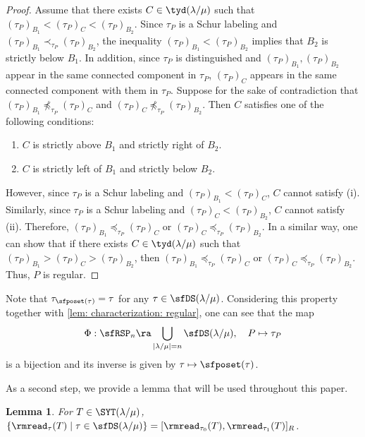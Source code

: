 \documentclass[12pt, reqno]{amsart}
\newtheorem{lemma}[theorem]{Lemma}
\theoremstyle{definition}
\numberwithin{equation}{section} \numberwithin{figure}{section}
\numberwithin{table}{section}
\begin{document}
\begin{proof}
Assume that there exists $C \in \tyd(\lambda/\mu)$ such that $(\tau_P)_{B_1} < (\tau_P)_C < (\tau_P)_{B_2}$.
Since $\tau_P$ is a Schur labeling and $(\tau_P)_{B_1} \prec_{\tau_P} (\tau_P)_{B_2}$, the inequality $(\tau_P)_{B_1} < (\tau_P)_{B_2}$ implies that $B_2$ is strictly below $B_1$.
In addition, since $\tau_P$ is distinguished and $(\tau_P)_{B_1},(\tau_P)_{B_2}$ appear in the same connected component in $\tau_P$, $(\tau_P)_{C}$ appears in the same connected component with them in $\tau_P$.
Suppose for the sake of contradiction that $(\tau_P)_{B_1} \not\preceq_{\tau_P} (\tau_P)_C$ and $(\tau_P)_{C} \not\preceq_{\tau_P} (\tau_P)_{B_2}$.
Then $C$ satisfies one of the following conditions:
\begin{enumerate}[label = {\rm (\roman*)}]
\item $C$ is strictly above $B_1$ and strictly right of $B_2$.
\item $C$ is strictly left of $B_1$ and strictly below $B_2$.
\end{enumerate}
However, since $\tau_P$ is a Schur labeling and $(\tau_P)_{B_1} < (\tau_P)_C$, $C$ cannot satisfy (i).
Similarly, since $\tau_P$ is a Schur labeling and $(\tau_P)_{C} < (\tau_P)_{B_2}$, $C$ cannot satisfy (ii).
Therefore, $(\tau_P)_{B_1} \preceq_{\tau_P} (\tau_P)_C$ or $(\tau_P)_{C} \preceq_{\tau_P} (\tau_P)_{B_2}$.
In a similar way, one can show that if there exists $C \in \tyd(\lambda/\mu)$ such that $(\tau_P)_{B_1} > (\tau_P)_C > (\tau_P)_{B_2}$, then $(\tau_P)_{B_1} \preceq_{\tau_P} (\tau_P)_C$ or $(\tau_P)_{C} \preceq_{\tau_P} (\tau_P)_{B_2}$.
Thus, $P$ is regular.
\end{proof}



Note that $\tau_{\sfposet(\tau)} = \tau$ for any $\tau \in \sfDS(\lambda / \mu)$.
Considering this property together with \cref{lem: characterization: regular}, one can see that 
the map \begin{align}\label{eq: bijection btw RSP and DS}
\Phi: 
\sfRSP_n \ra \bigcup_{|\lambda/\mu| = n} \sfDS(\lambda/\mu),
 \quad
 P \mapsto \tau_P
 \end{align}
is a bijection and its inverse is given by
$\tau \mapsto \sfposet(\tau)$.



As a second step, we provide a lemma that will be used throughout this paper.


\begin{lemma}\label{lem: fixed T int}
For $T \in \SYT(\lambda/\mu)$, 
$\{\rmread_\tau(T) \mid \tau \in \sfDS(\lambda/\mu)\} = [\rmread_{\tau_0}(T), \rmread_{\tau_1}(T)]_R$.
\end{lemma}
\end{document}
